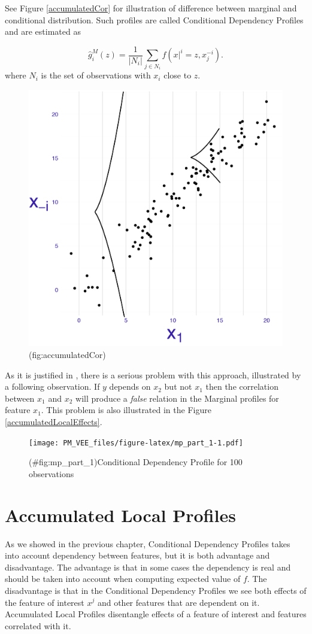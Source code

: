 \documentclass[12pt,]{krantz}
\theoremstyle{definition}
\theoremstyle{definition}
\theoremstyle{definition}
\theoremstyle{remark}
\begin{document}
See Figure \ref{accumulatedCor} for illustration of difference between
marginal and conditional distribution. Such profiles are called
Conditional Dependency Profiles and are estimated as

\[
\hat g^{M}_i(z) = \frac{1}{|N_i|} \sum_{j\in N_i} f(x|^i = z, x_j^{-i}). 
\] where \(N_i\) is the set of observations with \(x_i\) close to \(z\).

\begin{figure}

{\centering \includegraphics[width=0.4\linewidth]{figure/CP_ALE_2} 

}

\caption{(fig:accumulatedCor) }\label{fig:accumulatedCor}
\end{figure}

As it is justified in \citep{R-ALEPlot}, there is a serious problem with
this approach, illustrated by a following observation. If \(y\) depends
on \(x_2\) but not \(x_1\) then the correlation between \(x_1\) and
\(x_2\) will produce a \emph{false} relation in the Marginal profiles
for feature \(x_1\). This problem is also illustrated in the Figure
\ref{accumulatedLocalEffects}.

\begin{figure}
\centering
\texttt{[image: PM\_VEE\_files/figure-latex/mp\_part\_1-1.pdf]}
\caption{(\#fig:mp\_part\_1)Conditional Dependency Profile for 100
observations}
\end{figure}

\hypertarget{accumulatedLocalProfiles}{%
\section{Accumulated Local Profiles}\label{accumulatedLocalProfiles}}

As we showed in the previous chapter, Conditional Dependency Profiles
takes into account dependency between features, but it is both advantage
and disadvantage. The advantage is that in some cases the dependency is
real and should be taken into account when computing expected value of
\(f\). The disadvantage is that in the Conditional Dependency Profiles
we see both effects of the feature of interest \(x^j\) and other
features that are dependent on it. Accumulated Local Profiles
disentangle effects of a feature of interest and features correlated
with it.
\end{document}
